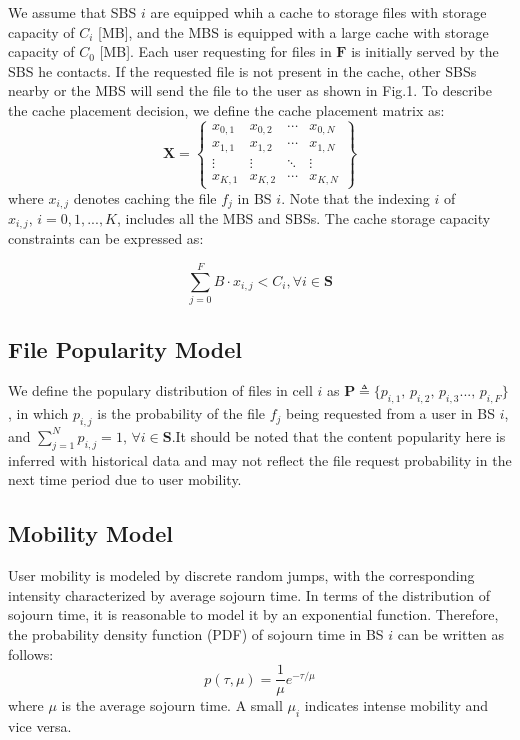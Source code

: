 \documentclass[conference]{IEEEtran}
\begin{document}
We assume that SBS $i$ are equipped whih a cache to storage files with storage capacity of $C_i$ [MB], and the MBS is equipped with a large cache with storage capacity of
$C_0$ [MB]. Each user requesting for files in $\mathbf{F}$ is initially served by the SBS he contacts. If the requested file is not present in the cache, other SBSs nearby or the MBS will send the file to the user as shown in Fig.1. To describe the cache placement decision, we define the cache placement matrix as:
$$\mathbf{X}=
\begin{Bmatrix}
x_{0,1}    &x_{0,2}  & \cdots & x_{0,N} \\
x_{1,1}    &x_{1,2}  & \cdots & x_{1,N} \\
\vdots    &\vdots  & \ddots &\vdots \\
x_{K,1}    &x_{K,2}  & \cdots & x_{K,N}
\end{Bmatrix}
$$
where $x_{i,j}$ denotes caching the file $f_j$ in BS $i$. Note that the indexing $i$ of $x_{i,j}\mathrm{,\,} i=0,1,...,K$, includes all the MBS and SBSs. The cache storage capacity constraints can be expressed as:

\begin{equation}
\sum_{j=0}^F B\cdot x_{i,j}<C_i,\forall{i}\in\mathbf{S}
\end{equation}

\subsection{File Popularity Model}
We define the populary distribution of files in cell $i$ as $\mathbf{P} \triangleq\{p_{i,1}\mathrm{,\,}p_{i,2}\mathrm{,\,}p_{i,3}...\mathrm{,\,}p_{i,F}\}$, in which $p_{i,j}$ is the probability of the file $f_j$ being requested from a user in BS $i$, and $ \sum_{j=1}^N p_{i,j}=1,\,\forall{i}\in\mathbf{S}$.It should be noted that the content popularity here is inferred with historical data and may not reflect the file request probability in the next time period due to user mobility.

\subsection{Mobility Model}
User mobility is modeled by discrete random jumps, with the corresponding intensity characterized by average sojourn time. In terms of the distribution of sojourn time, it is reasonable to model it by an exponential function\cite{8013789}. Therefore, the probability density function (PDF) of sojourn time in BS $i$ can be written as follows:
\begin{equation}
p(\tau,\mu)=\frac{1}{\mu}e^{-\tau/\mu}
\end{equation}
where $\mu$ is the average sojourn time. A small $\mu_i$ indicates intense mobility and vice versa.
\end{document}
